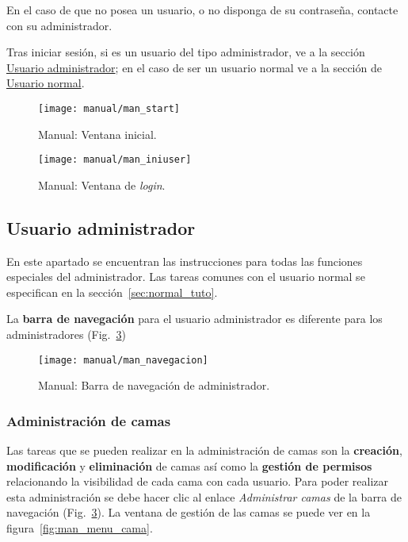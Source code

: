 En el caso de que no posea un usuario, o no disponga de su contraseña, contacte con su administrador.

Tras iniciar sesión, si es un usuario del tipo administrador, ve a la sección \hyperref[sec:admin_tuto]{Usuario administrador}; en el caso de ser un usuario normal ve a la sección de \hyperref[sec:normal_tuto]{Usuario normal}.

\begin{figure}
	\centering
	\texttt{[image: manual/man\_start]}
	\caption{Manual: Ventana inicial.}
	\label{fig:man_start}
\end{figure}
\begin{figure}
	\centering
	\texttt{[image: manual/man\_iniuser]}
	\caption{Manual: Ventana de \textit{login}.}
	\label{fig:man_inicio}
\end{figure}

\subsection{Usuario administrador}\label{sec:admin_tuto}

En este apartado se encuentran las instrucciones para todas las funciones especiales del administrador. Las tareas comunes con el usuario normal se especifican en la sección~\ref{sec:normal_tuto}.

La \textbf{barra de navegación} para el usuario administrador es diferente para los administradores (Fig.~\ref{fig:man_nav})

\begin{figure}
	\centering
	\texttt{[image: manual/man\_navegacion]}
	\caption{Manual: Barra de navegación de administrador.}
	\label{fig:man_nav}
\end{figure}

\subsubsection{Administración de camas}

Las tareas que se pueden realizar en la administración de camas son la \textbf{creación}, \textbf{modificación} y \textbf{eliminación} de camas así como la \textbf{gestión de permisos} relacionando la visibilidad de cada cama con cada usuario.  Para poder realizar esta administración se debe hacer clic al enlace \textit{Administrar camas} de la barra de navegación (Fig.~\ref{fig:man_nav}). La ventana de gestión de las camas se puede ver en la figura~\ref{fig:man_menu_cama}.

